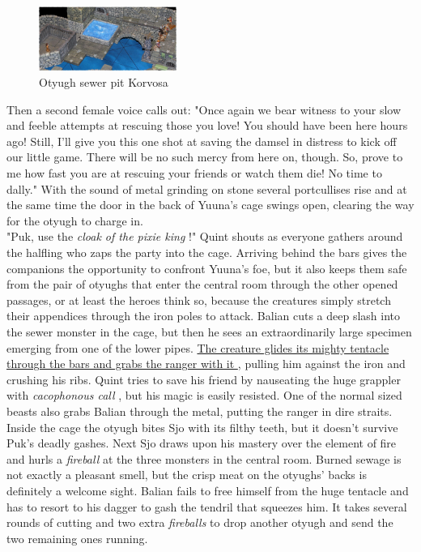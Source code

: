 \begin{figure}[h]
	\centering
	\includegraphics[width=0.4\textwidth]{images/Otyugh-sewer-pit-Korvosa-550449437_mod.jpg}
	\caption{Otyugh sewer pit Korvosa}
	\label{fig:Otyugh-sewer-pit-Korvosa-550449437}
\end{figure}

Then a second female voice calls out: "Once again we bear witness to your slow and feeble attempts at rescuing those you love! You should have been here hours ago! Still, I'll give you this one shot at saving the damsel in distress to kick off our little game. There will be no such mercy from here on, though. So, prove to me how fast you are at rescuing your friends or watch them die! No time to dally." With the sound of metal grinding on stone several portcullises rise and at the same time the door in the back of Yuuna's cage swings open, clearing the way for the otyugh to charge in.\\

"Puk, use the {\itshape cloak of the pixie king} !" Quint shouts as everyone gathers around the halfling who zaps the party into the cage. Arriving behind the bars gives the companions the opportunity to confront Yuuna's foe, but it also keeps them safe from the pair of otyughs that enter the central room through the other opened passages, or at least the heroes think so, because the creatures simply stretch their appendices through the iron poles to attack. Balian cuts a deep slash into the sewer monster in the cage, but then he sees an extraordinarily large specimen emerging from one of the lower pipes. \hyperref[fig:Otyugh-attack-in-Old-Korvosa-550450012]{ The creature glides its mighty tentacle through the bars and grabs the ranger with it } , pulling him against the iron and crushing his ribs. Quint tries to save his friend by nauseating the huge grappler with  {\itshape cacophonous call} , but his magic is easily resisted. One of the normal sized beasts also grabs Balian through the metal, putting the ranger in dire straits. Inside the cage the otyugh bites Sjo with its filthy teeth, but it doesn't survive Puk's deadly gashes. Next Sjo draws upon his mastery over the element of fire and hurls a  {\itshape fireball} at the three monsters in the central room. Burned sewage is not exactly a pleasant smell, but the crisp meat on the otyughs' backs is definitely a welcome sight. Balian fails to free himself from the huge tentacle and has to resort to his dagger to gash the tendril that squeezes him. It takes several rounds of cutting and two extra  {\itshape fireballs} to drop another otyugh and send the two remaining ones running. \\

